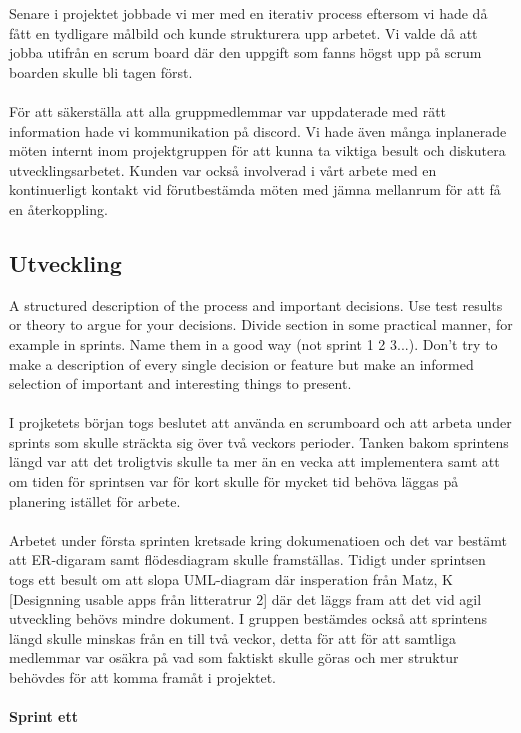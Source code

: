 \documentclass[12pt]{article}
\begin{document}
Senare i projektet jobbade vi mer med en iterativ process eftersom vi hade då fått en tydligare målbild och kunde strukturera upp arbetet. Vi valde då att jobba utifrån en scrum board där den uppgift som fanns högst upp på scrum boarden skulle bli tagen först. \\\\
För att säkerställa att alla gruppmedlemmar var uppdaterade med rätt information hade vi kommunikation på discord. Vi hade även många inplanerade möten internt inom projektgruppen för att kunna ta viktiga besult och diskutera utvecklingsarbetet. Kunden var också involverad i vårt arbete med en kontinuerligt kontakt vid förutbestämda möten med jämna mellanrum för att få en återkoppling.  


\subsection{Utveckling}
A structured description of the process and important decisions. Use test results or theory to argue for your decisions. Divide section in some practical manner, for example in sprints. Name them in a good way (not sprint 1 2 3...). Don’t try to make a description of every single decision or feature but make an informed selection of important and interesting things to present.\\\\
I projketets början togs beslutet att använda en scrumboard och att arbeta under sprints som skulle sträckta sig över två veckors perioder. Tanken bakom sprintens längd var att det troligtvis skulle ta mer än en vecka att implementera samt att om tiden för sprintsen var för kort skulle för mycket tid behöva läggas på planering istället för arbete.\\\\
Arbetet under första sprinten kretsade kring dokumenatioen och det var bestämt att ER-digaram samt flödesdiagram skulle framställas. Tidigt under sprintsen togs ett besult om att slopa UML-diagram där insperation från Matz, K [Designning usable apps från litteratrur 2] där det läggs fram att det vid agil utveckling behövs mindre dokument. 
I gruppen bestämdes också att sprintens längd skulle minskas från en till två veckor, detta för att för att samtliga medlemmar var osäkra på vad som faktiskt skulle göras och mer struktur behövdes för att komma framåt i projektet. \\\\
\textbf{Sprint ett}\\\\
\end{document}
